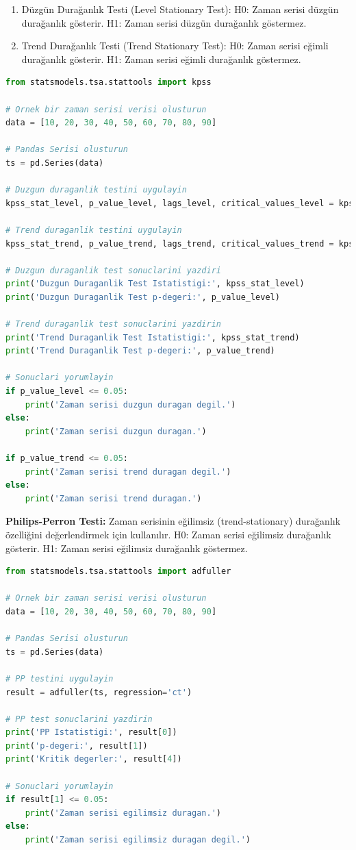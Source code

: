 \begin{enumerate}
    \item Düzgün Durağanlık Testi (Level Stationary Test): H0: Zaman serisi düzgün durağanlık gösterir. H1: Zaman serisi düzgün durağanlık göstermez.
    \item Trend Durağanlık Testi (Trend Stationary Test): H0: Zaman serisi eğimli durağanlık gösterir. H1: Zaman serisi eğimli durağanlık göstermez.
\end{enumerate}

\begin{lstlisting}[language=Python]
from statsmodels.tsa.stattools import kpss

# Ornek bir zaman serisi verisi olusturun
data = [10, 20, 30, 40, 50, 60, 70, 80, 90]

# Pandas Serisi olusturun
ts = pd.Series(data)

# Duzgun duraganlik testini uygulayin
kpss_stat_level, p_value_level, lags_level, critical_values_level = kpss(ts, regression='c')

# Trend duraganlik testini uygulayin
kpss_stat_trend, p_value_trend, lags_trend, critical_values_trend = kpss(ts, regression='ct')

# Duzgun duraganlik test sonuclarini yazdiri
print('Duzgun Duraganlik Test Istatistigi:', kpss_stat_level)
print('Duzgun Duraganlik Test p-degeri:', p_value_level)

# Trend duraganlik test sonuclarini yazdirin
print('Trend Duraganlik Test Istatistigi:', kpss_stat_trend)
print('Trend Duraganlik Test p-degeri:', p_value_trend)

# Sonuclari yorumlayin
if p_value_level <= 0.05:
    print('Zaman serisi duzgun duragan degil.')
else:
    print('Zaman serisi duzgun duragan.')

if p_value_trend <= 0.05:
    print('Zaman serisi trend duragan degil.')
else:
    print('Zaman serisi trend duragan.')
\end{lstlisting}

\textbf{Philips-Perron Testi:} Zaman serisinin eğilimsiz (trend-stationary) durağanlık özelliğini değerlendirmek için kullanılır. H0: Zaman serisi eğilimsiz durağanlık gösterir. H1: Zaman serisi eğilimsiz durağanlık göstermez.

\begin{lstlisting}[language=Python]
from statsmodels.tsa.stattools import adfuller

# Ornek bir zaman serisi verisi olusturun
data = [10, 20, 30, 40, 50, 60, 70, 80, 90]

# Pandas Serisi olusturun
ts = pd.Series(data)

# PP testini uygulayin
result = adfuller(ts, regression='ct')

# PP test sonuclarini yazdirin
print('PP Istatistigi:', result[0])
print('p-degeri:', result[1])
print('Kritik degerler:', result[4])

# Sonuclari yorumlayin
if result[1] <= 0.05:
    print('Zaman serisi egilimsiz duragan.')
else:
    print('Zaman serisi egilimsiz duragan degil.')
\end{lstlisting}

